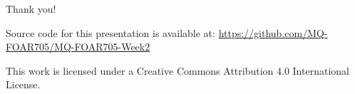 \documentclass[aspectratio=43, 11pt]{beamer} %
\begin{document}
  
%   
%   


\begin{frame}{Thank you!}


Source code for this presentation is available at: \url{https://github.com/MQ-FOAR705/MQ-FOAR705-Week2}

This work is licensed under a Creative Commons Attribution 4.0 International License.

\end{frame}
\end{document}
